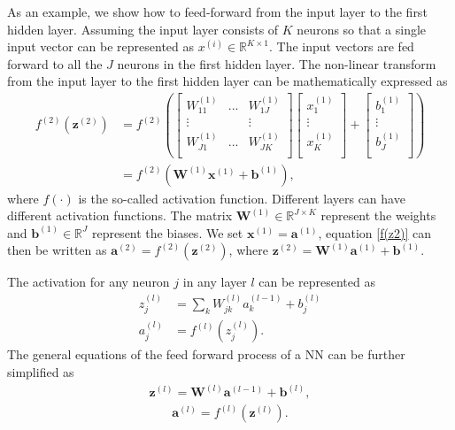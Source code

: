 \documentclass[a4paper]{article}
\begin{document}
As an example, we show how to feed-forward from the input layer to the first hidden layer. Assuming the input layer consists of $K$ neurons so that a single input vector can be represented as $x^{(i)}\in\mathbb{R}^{K \times 1}$. The input vectors are fed forward to all the $J$ neurons in the first hidden layer. The non-linear transform from the input layer to the first hidden layer can be mathematically expressed as
\begin{align}
    f^{(2)}(\mathbf{z}^{(2)}) 
    &= f^{(2)}\left(\left[\begin{array}{ccc}
        W^{(1)}_{11} &... &W^{(1)}_{1J} \\
        \vdots &  &\vdots\\
        W^{(1)}_{J1} &... &W^{(1)}_{JK} \\
        \end{array} \right] 
        \left[\begin{array}{c}
           x^{(1)}_{1} \\
           \vdots\\
           x^{(1)}_{K} \\
        \end{array}\right] + 
        \left[\begin{array}{c}
           b^{(1)}_{1} \\
           \vdots\\
           b^{(1)}_{J} \\
        \end{array}\right]\right)\nonumber\\
    &= f^{(2)}(\mathbf{W}^{(1)}\mathbf{x}^{(1)} + \mathbf{b}^{(1)}),
\label{f(z2)} 
\end{align}
where $f(\cdot)$ is the so-called activation function. Different layers can have different activation functions. The matrix $\mathbf{W}^{(1)} \in \mathbb{R}^{J \times K}$ represent the weights and $\mathbf{b} ^{(1)} \in \mathbb{R}^{J}$ represent the biases. We set $\mathbf{x}^{(1)} = \mathbf{a}^{(1)}$, equation \ref{f(z2)} can then be written as $\mathbf{a}^{(2)} = f^{(2)}(\mathbf{z}^{(2)})$, where $\mathbf{z}^{(2)} = \mathbf{W}^{(1)} \mathbf{a}^{(1)} + \mathbf{b}^{(1)}$. 

The activation for any neuron $j$ in any layer $l$ can be represented as 
\begin{align}
    z_j^{(l)}
    &= \sum_{k}^{ } W^{(l)}_{jk} a^{(l-1)}_k + b^{(l)}_j \nonumber \\
    a_j^{(l)} 
    &= f^{(l)}(z_j^{(l)}).
\end{align}
The general equations of the feed forward process of a NN can be further simplified as
\begin{align}
    \mathbf{z}^{(l)}
    = \mathbf{W}^{(l)}\mathbf{a}^{(l-1)} + \mathbf{b}^{(l)},
\label{_auto11} 
\end{align}
\begin{align}
    \mathbf{a}^{(l)}=f^{(l)}(\mathbf{z}^{(l)}).
\end{align}
\end{document}
